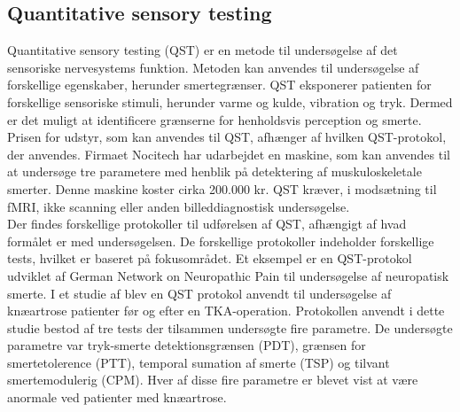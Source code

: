 \subsection{Quantitative sensory testing}
Quantitative sensory testing (QST) er en metode til undersøgelse af det sensoriske nervesystems funktion. Metoden kan anvendes til undersøgelse af forskellige egenskaber, herunder smertegrænser. QST eksponerer patienten for forskellige sensoriske stimuli, herunder varme og kulde, vibration og tryk. Dermed er det muligt at identificere grænserne for henholdsvis perception og smerte. \citep{Yarnitsky2006} Prisen for udstyr, som kan anvendes til QST, afhænger af hvilken QST-protokol, der anvendes. Firmaet Nocitech har udarbejdet en maskine, som kan anvendes til at undersøge tre parametere med henblik på detektering af muskuloskeletale smerter. Denne maskine koster cirka 200.000 kr. \citep{NociTech2016} QST kræver, i modsætning til fMRI, ikke scanning eller anden billeddiagnostisk undersøgelse. \\
Der findes forskellige protokoller til udførelsen af QST, afhængigt af hvad formålet er med undersøgelsen. De forskellige protokoller indeholder forskellige tests, hvilket er baseret på fokusområdet. Et eksempel er en QST-protokol udviklet af German Network on Neuropathic Pain til undersøgelse af neuropatisk smerte. \citep{Rolke2006} I et studie af  blev en QST protokol anvendt til undersøgelse af knæartrose patienter før og efter en TKA-operation. Protokollen anvendt i dette studie bestod af tre tests der tilsammen undersøgte fire parametre. De undersøgte parametre var tryk-smerte detektionsgrænsen (PDT), grænsen for smertetolerence (PTT), temporal sumation af smerte (TSP) og tilvant smertemodulerig (CPM). \citep{Petersen2016} Hver af disse fire parametre er blevet vist at være anormale ved patienter med knæartrose. \citep{Suokas2012} \citep{Petersen2016}   

